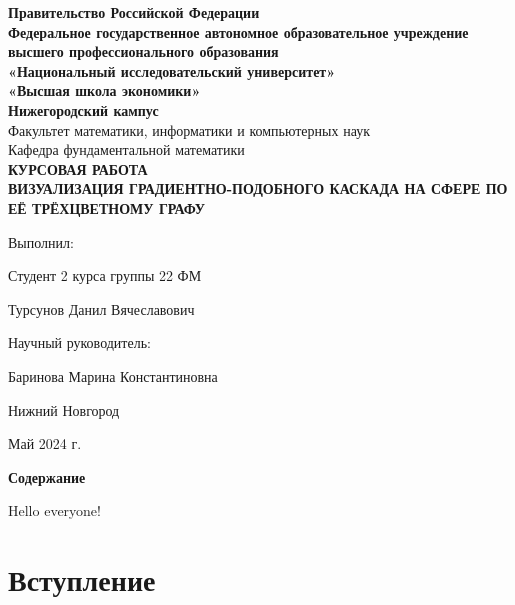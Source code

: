 


	\setcounter{page}{1}
	
	\begin{center} 
		\textbf{Правительство Российской Федерации}
		\\ \textbf{Федеральное государственное автономное образовательное учреждение}
		\\ \textbf{высшего профессионального образования}
		\\ \textbf{«Национальный исследовательский университет»}
		\\ \textbf{«Высшая школа экономики»}
		\\ \textbf{Нижегородский кампус}
		\vspace{3cm}
		\\ Факультет математики, информатики и компьютерных наук
		\\ Кафедра фундаментальной математики
		\vspace{3cm}
		\\ \large\textbf{КУРСОВАЯ РАБОТА}
		\vspace{0.3cm}
		\\ \large\textbf{ВИЗУАЛИЗАЦИЯ ГРАДИЕНТНО-ПОДОБНОГО КАСКАДА НА СФЕРЕ ПО ЕЁ ТРЁХЦВЕТНОМУ ГРАФУ}
	\end{center}
	
	\vspace{3cm}\hspace{8cm} Выполнил: 
	\par \hspace{8cm} Студент 2 курса группы 22 ФМ 
	\par \hspace{8cm} Турсунов Данил Вячеславович
	\par \vspace{0.8cm} \hspace{8cm} Научный руководитель:
	\par \hspace{8cm} Баринова Марина Константиновна
	\begin{center} 
		\vspace{4cm} Нижний Новгород
		\par Май 2024 г.
	\end{center}
	
	\newpage
	\begin{center}
		\LARGE\textbf{Содержание}
	\end{center}
	\newpage

	\textsf{Hello everyone!}
	\section{Вступление}
